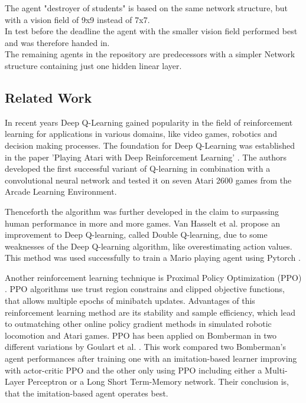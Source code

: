 The agent "destroyer of students" is based on the same network structure, but with a vision field of 9x9 instead of 7x7.\\
In test before the deadline the agent with the smaller vision field performed best and was therefore handed in.\\
The remaining agents in the repository are predecessors with a simpler Network structure containing just one hidden linear layer.

\newpage
{}
\subsection{Related Work}

In recent years Deep Q-Learning gained popularity in the field of reinforcement learning for applications in various domains, like video games, robotics and decision making processes. The foundation for Deep Q-Learning was established in the paper 'Playing Atari with Deep Reinforcement Learning' \cite{deepRL}. The authors developed the first successful variant of Q-learning in combination with a convolutional neural network and tested it on seven Atari 2600 games from the Arcade Learning Environment.

Thenceforth the algorithm was further developed in the claim to surpassing human performance in more and more games. Van Hasselt et al. \cite{doubleQ} propose an improvement to Deep Q-learning, called Double Q-learning, due to some weaknesses of the Deep Q-learning algorithm, like overestimating action values. This method was used successfully to train a Mario playing agent using Pytorch \cite{mario}.

Another reinforcement learning technique is Proximal Policy Optimization (PPO) \cite{ppo}. PPO algorithms use trust region constrains and clipped objective functions, that allows multiple epochs of minibatch updates. Advantages of this reinforcement learning method are its stability and sample efficiency, which lead to outmatching other online policy gradient methods in simulated robotic locomotion and Atari games. PPO has been applied on Bomberman in two different variations by Goulart et al. \cite{ppobomberman}. This work compared two Bomberman's agent performances after training one with an imitation-based learner improving with actor-critic PPO and the other only using PPO including either a Multi-Layer Perceptron or a Long Short Term-Memory network. Their conclusion is, that the imitation-based agent operates best. 
